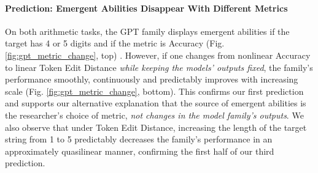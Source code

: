 

\paragraph{Prediction: Emergent Abilities Disappear With Different Metrics}
On both arithmetic tasks, the GPT family displays emergent abilities if the target has 4 or 5 digits and if the metric is Accuracy (Fig. \ref{fig:gpt_metric_change}, top) \cite{brown2020language, ganguli2022predictability,wei2022emergent}. However, if one changes from nonlinear Accuracy to linear Token Edit Distance \textit{while keeping the models' outputs fixed}, the family's performance smoothly, continuously and predictably improves with increasing scale (Fig. \ref{fig:gpt_metric_change}, bottom). This confirms our first prediction and supports our alternative explanation that the source of emergent abilities is the researcher's choice of metric, \textit{not changes in the model family's outputs}. We also observe that under Token Edit Distance, increasing the length of the target string from 1 to 5 predictably decreases the family's performance in an approximately quasilinear manner, confirming the first half of our third prediction.




